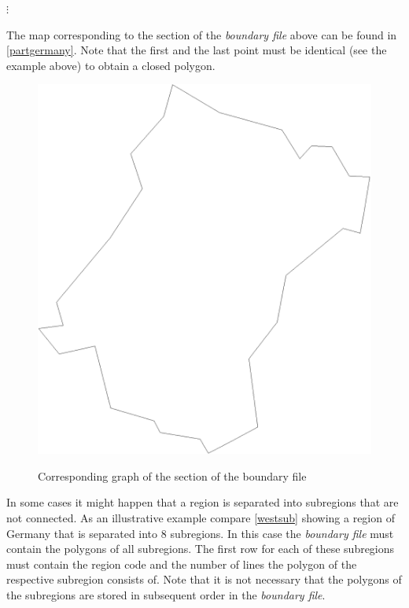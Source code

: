 \hspace{1cm} $\vdots$

\normalsize

\vspace{0.3cm}

The  map corresponding to the section of the {\em boundary file}
above can be found in \autoref{partgermany}. Note that the first
and the last point must be identical (see the example above) to
obtain a closed polygon.


\begin{figure}[ht]
\centering
\includegraphics [scale=0.3]{grafiken/westpart.eps}
{\em\caption{\label{partgermany} Corresponding graph of the
section of the boundary file}}
\end{figure}

In some cases it might happen that a region is separated into
subregions that are not connected. As an illustrative example
compare \autoref{westsub} showing a region of Germany that is
separated into 8 subregions. In this case the {\em boundary file}
must contain the polygons of all subregions. The first row for
each of these subregions must contain the region code and the
number of lines the polygon of the respective subregion consists
of. Note that it is not necessary that the polygons of the
subregions are stored in subsequent order in the {\em boundary
file}.


